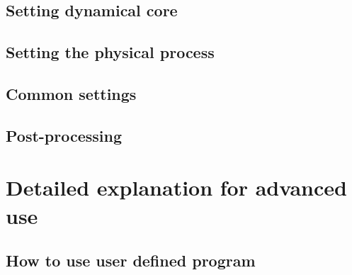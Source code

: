 \documentclass[a4paper]{report}
\begin{document}
\chapter{Setting dynamical core}

 \chapter{Setting the physical process} \label{sec:basic_usel_physics}
 
 \newpage
 
 \newpage
 
 \newpage
 
 \newpage
 
 \newpage
 
 \newpage
 
%  
%  

 \chapter{Common settings}
%  
%  
%  

 \chapter{Post-processing} \label{sec:basic_usel_post}
 
 \clearpage
 

\part{Detailed explanation for advanced use} \label{part:advance_use}
%  

 \chapter{How to use user defined program}
%  
%  
%  
\end{document}
